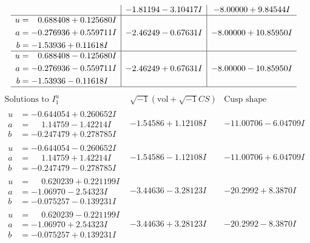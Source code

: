 \documentclass[1p]{elsarticle_modified}
\theoremstyle{definition}
\newcommand{\I}{\sqrt{-1}}
\begin{document}
$$\begin{array}{c|c|c}
 & -1.81194 - 3.10417 I & -8.00000 + 9.84544 I \\ \hline\begin{aligned}
u &= \phantom{-}0.688408 + 0.125680 I \\
a &= -0.276936 + 0.559711 I \\
b &= -1.53936 + 0.11618 I\end{aligned}
 & -2.46249 - 0.67631 I & -8.00000 + 10.85950 I \\ \hline\begin{aligned}
u &= \phantom{-}0.688408 - 0.125680 I \\
a &= -0.276936 - 0.559711 I \\
b &= -1.53936 - 0.11618 I\end{aligned}
 & -2.46249 + 0.67631 I & -8.00000 - 10.85950 I\\
 \hline 
 \end{array}$$\newpage$$\begin{array}{c|c|c}  
\text{Solutions to }I^u_{1}& \I (\text{vol} + \sqrt{-1}CS) & \text{Cusp shape}\\
 \hline 
\begin{aligned}
u &= -0.644054 + 0.260652 I \\
a &= \phantom{-}1.14759 - 1.42214 I \\
b &= -0.247479 + 0.278785 I\end{aligned}
 & -1.54586 + 1.12108 I & -11.00706 - 6.04709 I \\ \hline\begin{aligned}
u &= -0.644054 - 0.260652 I \\
a &= \phantom{-}1.14759 + 1.42214 I \\
b &= -0.247479 - 0.278785 I\end{aligned}
 & -1.54586 - 1.12108 I & -11.00706 + 6.04709 I \\ \hline\begin{aligned}
u &= \phantom{-}0.620239 + 0.221199 I \\
a &= -1.06970 - 2.54323 I \\
b &= -0.075257 - 0.139231 I\end{aligned}
 & -3.44636 - 3.28123 I & -20.2992 + 8.3870 I \\ \hline\begin{aligned}
u &= \phantom{-}0.620239 - 0.221199 I \\
a &= -1.06970 + 2.54323 I \\
b &= -0.075257 + 0.139231 I\end{aligned}
 & -3.44636 + 3.28123 I & -20.2992 - 8.3870 I \\ \hline\begin{aligned}

\end{aligned}
\end{array}$$
\end{document}
